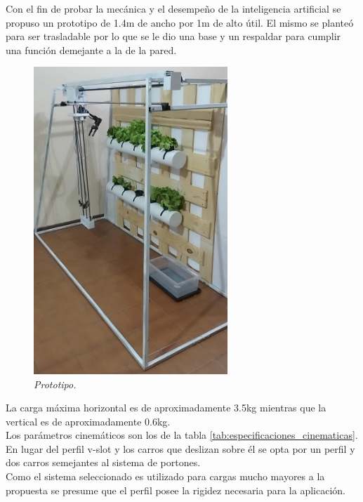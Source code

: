 Con el fin de probar la mecánica y el desempeño de la inteligencia artificial se propuso un prototipo de 1.4m de ancho por 1m de alto útil. El mismo se planteó para ser trasladable por lo que se le dio una base y un respaldar para cumplir una función demejante a la de la pared.
\begin{figure}[H]
    \centering
        \includegraphics[width=0.65\textwidth]{img/estructura.jpg}
        \caption{\textit{Prototipo.}}
        \label{fig:estructura}
\end{figure}
La carga máxima horizontal es de aproximadamente 3.5kg mientras que la vertical es de aproximadamente 0.6kg.\\
Los parámetros cinemáticos son los de la tabla \ref{tab:especificaciones_cinematicas}.\\
En lugar del perfil v-slot y los carros que deslizan sobre él se opta por un perfil y dos carros semejantes al sistema de portones.\\
Como el sistema seleccionado es utilizado para cargas mucho mayores a la propuesta se presume que el perfil posee la rigidez necesaria para la aplicación.
